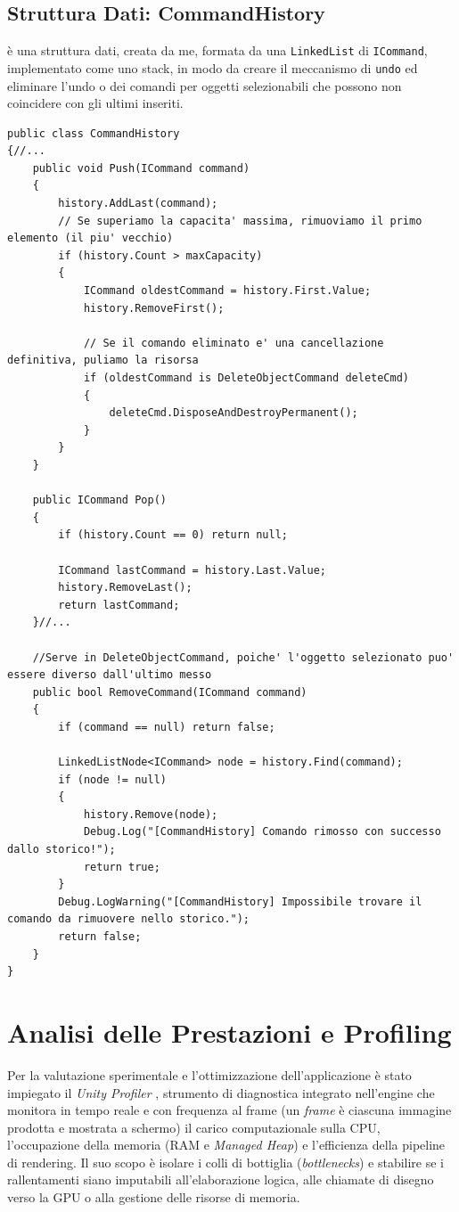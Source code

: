 \subsection{Struttura Dati: CommandHistory}
è una struttura dati, creata da me, formata da una \texttt{LinkedList} di \texttt{ICommand}, implementato come uno stack, in modo da creare il meccanismo di \texttt{undo} ed eliminare l'undo o dei comandi per oggetti selezionabili che possono non coincidere con gli ultimi inseriti. 
\begin{lstlisting}[language={[Sharp]C}]
public class CommandHistory
{//...
    public void Push(ICommand command)
    {
        history.AddLast(command);
        // Se superiamo la capacita' massima, rimuoviamo il primo elemento (il piu' vecchio)
        if (history.Count > maxCapacity)
        {
            ICommand oldestCommand = history.First.Value;
            history.RemoveFirst();

            // Se il comando eliminato e' una cancellazione definitiva, puliamo la risorsa
            if (oldestCommand is DeleteObjectCommand deleteCmd)
            {
                deleteCmd.DisposeAndDestroyPermanent();
            }
        }
    }

    public ICommand Pop()
    {
        if (history.Count == 0) return null;

        ICommand lastCommand = history.Last.Value;
        history.RemoveLast();
        return lastCommand;
    }//...

    //Serve in DeleteObjectCommand, poiche' l'oggetto selezionato puo' essere diverso dall'ultimo messo
    public bool RemoveCommand(ICommand command)
    {
        if (command == null) return false;

        LinkedListNode<ICommand> node = history.Find(command);
        if (node != null)
        {
            history.Remove(node);
            Debug.Log("[CommandHistory] Comando rimosso con successo dallo storico!");
            return true;
        }
        Debug.LogWarning("[CommandHistory] Impossibile trovare il comando da rimuovere nello storico.");
        return false;
    }
}
\end{lstlisting}

\section{Analisi delle Prestazioni e Profiling}

Per la valutazione sperimentale e l'ottimizzazione dell'applicazione è stato impiegato il \textit{Unity Profiler}\cite{profiler} \cite{Unity-General}, strumento di diagnostica integrato nell'engine che monitora in tempo reale e con frequenza al frame (un \textit{frame} è ciascuna immagine prodotta e mostrata a schermo) il carico computazionale sulla CPU, l'occupazione della memoria (RAM e \textit{Managed Heap}) e l'efficienza della pipeline di rendering. Il suo scopo è isolare i colli di bottiglia (\textit{bottlenecks}) e stabilire se i rallentamenti siano imputabili all'elaborazione logica, alle chiamate di disegno verso la GPU o alla gestione delle risorse di memoria.


